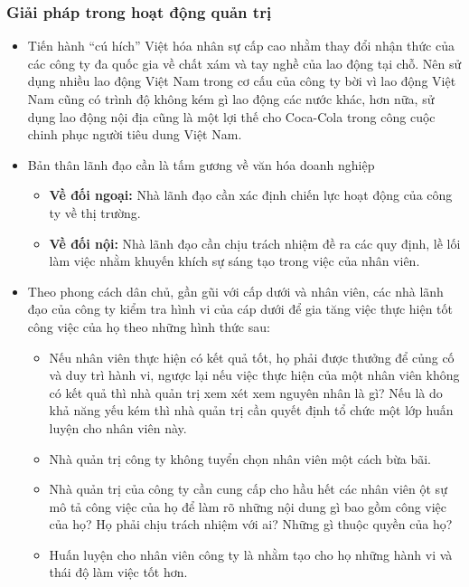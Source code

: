 \documentclass{article}
\begin{document}
    \subsubsection{Giải pháp trong hoạt động quản trị}
    \begin{itemize}
        \item Tiến hành “cú hích” Việt hóa nhân sự cấp cao nhằm thay đổi nhận thức của các công ty đa quốc gia về chất xám và tay nghề của lao động tại chỗ. Nên sử dụng nhiều lao động Việt Nam trong cơ cấu của công ty bời vì lao động Việt Nam cũng có trình độ không kém gì lao động các nước khác, hơn nữa, sử dụng lao động nội địa cũng là một lợi thế cho Coca-Cola trong công cuộc chinh phục người tiêu dung Việt Nam.
        \item Bản thân lãnh đạo cần là tấm gương về văn hóa doanh nghiệp
        \begin{itemize}
            \item \textbf{Về đối ngoại:} Nhà lãnh đạo cần xác định chiến lực hoạt động của công ty về thị trường.
            \item \textbf{Về đối nội:} Nhà lãnh đạo cần chịu trách nhiệm đề ra các quy định, lề lối làm việc nhằm khuyến khích sự sáng tạo trong việc của nhân viên.
        \end{itemize}
        \item Theo phong cách dân chủ, gần gũi với cấp dưới và nhân viên, các nhà lãnh đạo của công ty kiểm tra hình vi của cáp dưới để gia tăng việc thực hiện tốt công việc của họ theo những hình thức sau:
        \begin{itemize}
            \item Nếu nhân viên thực hiện có kết quả tốt, họ phải được thưởng để củng cố và duy trì hành vi, ngược lại nếu việc thực hiện của một nhân viên không có kết quả thì nhà quản trị xem xét xem nguyên nhân là gì? Nếu là do khả năng yếu kém thì nhà quản trị cần quyết định tổ chức một lớp huấn luyện cho nhân viên này.
            \item Nhà quản trị công ty không tuyển chọn nhân viên một cách bừa bãi.
            \item Nhà quản trị của công ty cần cung cấp cho hầu hết các nhân viên ột sự mô tả công việc của họ để làm rõ những nội dung gì bao gồm công việc của họ? Họ phải chịu trách nhiệm với ai? Những gì thuộc quyền của họ?
            \item Huấn luyện cho nhân viên công ty là nhằm tạo cho họ những hành vi và thái độ làm việc tốt hơn.
        \end{itemize}
    \end{itemize}
\end{document}
